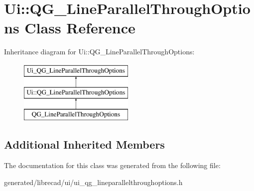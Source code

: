 \hypertarget{classUi_1_1QG__LineParallelThroughOptions}{\section{Ui\-:\-:Q\-G\-\_\-\-Line\-Parallel\-Through\-Options Class Reference}
\label{classUi_1_1QG__LineParallelThroughOptions}
}
Inheritance diagram for Ui\-:\-:Q\-G\-\_\-\-Line\-Parallel\-Through\-Options\-:\begin{figure}[H]
\begin{center}
\leavevmode
\includegraphics[height=3.000000cm]{classUi_1_1QG__LineParallelThroughOptions}
\end{center}
\end{figure}
\subsection*{Additional Inherited Members}


The documentation for this class was generated from the following file\-:\begin{DoxyCompactItemize}
\item 
generated/librecad/ui/ui\-\_\-qg\-\_\-lineparallelthroughoptions.\-h\end{DoxyCompactItemize}
